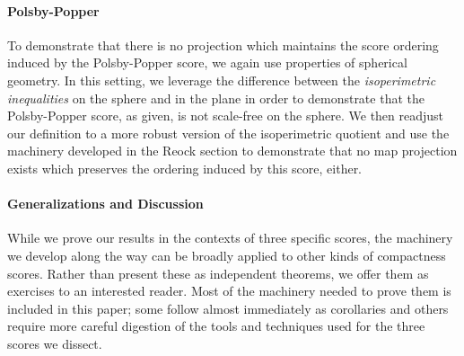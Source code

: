 \paragraph{Polsby-Popper}
To demonstrate that there is no projection which maintains the score ordering induced by the Polsby-Popper score, we again use properties of spherical geometry.  In this setting, we leverage the 
difference between the \textit{isoperimetric inequalities} on the sphere and in the plane in order to 
demonstrate that the Polsby-Popper score, as given, is not scale-free on the sphere.  We then readjust 
our definition to a more robust version of the isoperimetric quotient and use the machinery developed 
in the Reock section to demonstrate that no map projection exists which preserves the ordering induced by this score, either.

\paragraph{Generalizations and Discussion}
While we prove our results in the contexts of three specific scores, the machinery we develop along the way can be broadly applied to other kinds of compactness scores.  Rather than present these as independent theorems, we offer them as exercises to an interested reader.  Most of the machinery needed to prove them is included in this paper; some follow almost immediately as corollaries and others require more careful digestion of the tools and techniques used for the three scores we dissect.



